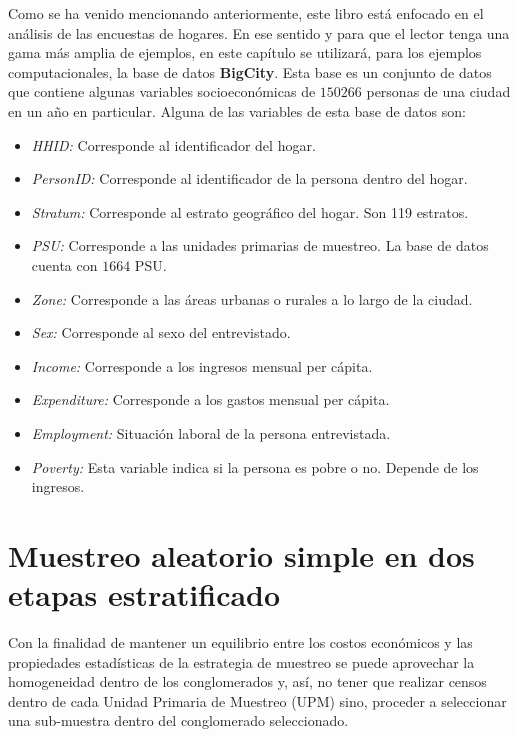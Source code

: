 \documentclass[
  12pt,
]{book}
\begin{document}
Como se ha venido mencionando anteriormente, este libro está enfocado en el análisis de las encuestas de hogares. En ese sentido y para que el lector tenga una gama más amplia de ejemplos, en este capítulo se utilizará, para los ejemplos computacionales, la base de datos \textbf{BigCity}. Esta base es un conjunto de datos que contiene algunas variables socioeconómicas de \(150266\) personas de una ciudad en un año en particular. Alguna de las variables de esta base de datos son:

\begin{itemize}
\item
  \emph{HHID:} Corresponde al identificador del hogar.
\item
  \emph{PersonID:} Corresponde al identificador de la persona dentro del hogar.
\item
  \emph{Stratum:} Corresponde al estrato geográfico del hogar. Son 119 estratos.
\item
  \emph{PSU:} Corresponde a las unidades primarias de muestreo. La base de datos cuenta con \(1664\) PSU.
\item
  \emph{Zone:} Corresponde a las áreas urbanas o rurales a lo largo de la ciudad.
\item
  \emph{Sex:} Corresponde al sexo del entrevistado.
\item
  \emph{Income:} Corresponde a los ingresos mensual per cápita.
\item
  \emph{Expenditure:} Corresponde a los gastos mensual per cápita.
\item
  \emph{Employment:} Situación laboral de la persona entrevistada.
\item
  \emph{Poverty:} Esta variable indica si la persona es pobre o no. Depende de los ingresos.
\end{itemize}

\hypertarget{muestreo-aleatorio-simple-en-dos-etapas-estratificado}{%
\section{Muestreo aleatorio simple en dos etapas estratificado}\label{muestreo-aleatorio-simple-en-dos-etapas-estratificado}}

Con la finalidad de mantener un equilibrio entre los costos económicos y las propiedades estadísticas de la estrategia de muestreo se puede aprovechar la homogeneidad dentro de los conglomerados y, así, no tener que realizar censos dentro de cada Unidad Primaria de Muestreo (UPM) sino, proceder a seleccionar una sub-muestra dentro del conglomerado seleccionado.
\end{document}
